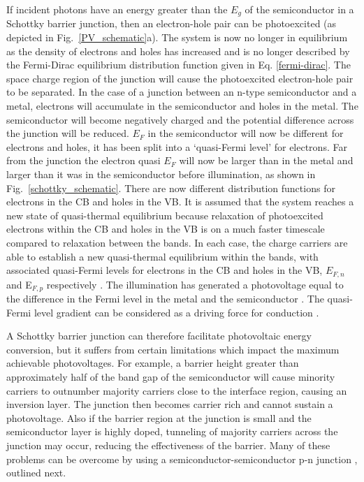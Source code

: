 \documentclass[11pt, twoside]{report}
\begin{document}
If incident photons have an energy greater than the $E_g$ of the semiconductor in a Schottky barrier junction, then an electron-hole pair can be photoexcited (as depicted in Fig.~\ref{PV_schematic}a). The system is now no longer in equilibrium as the density of electrons and holes has increased and is no longer described by the Fermi-Dirac equilibrium distribution function given in Eq. \ref{fermi-dirac}. 
The space charge region of the junction will cause the photoexcited electron-hole pair to be separated. In the case of a junction between an n-type semiconductor and a metal, electrons will accumulate in the semiconductor and holes in the metal. The semiconductor will become negatively charged and the potential difference across the junction will be reduced. $E_F$ in the semiconductor will now be different for electrons and holes, it has been split into a `quasi-Fermi level' for electrons. Far from the junction the electron quasi $E_F$ will now be larger than in the metal and larger than it was in the semiconductor before illumination, as shown in Fig.~\ref{schottky_schematic}.
There are now different distribution functions for electrons in the CB and holes in the VB. It is assumed that the system reaches a new state of quasi-thermal equilibrium because relaxation of photoexcited electrons within the CB and holes in the VB is on a much faster timescale compared to relaxation between the bands. In each case, the charge carriers are able to establish a new quasi-thermal equilibrium within the bands, with associated quasi-Fermi levels for electrons in the CB and holes in the VB, $E_{F,n}$ and E$_{F,p}$ respectively
\cite{Nelson3}.
 The illumination has generated a photovoltage equal to the difference in the Fermi level in the metal and the semiconductor \cite{Nelson5}. The quasi-Fermi level gradient can be considered as a driving force for conduction \cite{Nelson3}.

A Schottky barrier junction can therefore facilitate photovoltaic energy conversion, but it suffers from certain limitations which impact the maximum achievable photovoltages. For example, a barrier height greater than approximately half of the band gap of the semiconductor will cause minority carriers to outnumber majority carriers close to the interface region, causing an inversion layer. The junction then becomes carrier rich and cannot sustain a photovoltage. Also if the barrier region at the junction is small and the semiconductor layer is highly doped, tunneling of majority carriers across the junction may occur, reducing the effectiveness of the barrier. Many of these problems can be overcome by using a semiconductor-semiconductor p-n junction \cite{Nelson5}, outlined next.
\end{document}
